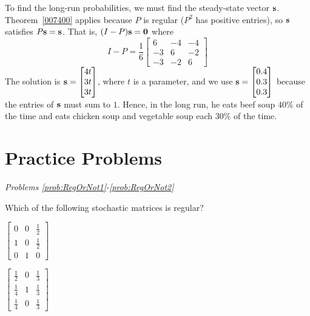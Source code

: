 \documentclass{ximera}
\begin{document}
\begin{example}
\begin{explanation}
To find the long-run probabilities, we must find the steady-state vector ${\bf s}$. Theorem~\ref{007400} applies because $P$ is regular ($P^{2}$ has positive entries), so ${\bf s}$ satisfies $P{\bf s} = {\bf s}$. That is, $(I - P){\bf s} = {\bf 0}$ where
\begin{equation*}
I - P = \frac{1}{6} \begin{bmatrix}
6 & -4 & -4 \\
-3 & 6 & -2 \\
-3 & -2 & 6
\end{bmatrix}
\end{equation*}
The solution is ${\bf s} = \begin{bmatrix}
4t \\
3t \\
3t
\end{bmatrix}$,
 where $t$ is a parameter, and we use ${\bf s} = \begin{bmatrix}
 0.4 \\
 0.3 \\
 0.3
\end{bmatrix}$
 because the entries of ${\bf s}$ must sum to $1$. Hence, in the long run, he eats beef soup $40\%$ of the time and eats chicken soup and vegetable soup each $30\%$ of the time.
\end{explanation}
\end{example}

\section*{Practice Problems}

\emph{Problems \ref{prob:RegOrNot1}-\ref{prob:RegOrNot2}}

Which of the following stochastic matrices is regular?

\begin{problem}\label{prob:RegOrNot1}
$\begin{bmatrix}
0 & 0 & \frac{1}{2} \\
1 & 0 & \frac{1}{2} \\
0 & 1 & 0
\end{bmatrix}$
 \begin{multipleChoice}
 \end{multipleChoice}
\end{problem}

\begin{problem}\label{prob:RegOrNot2}
$\begin{bmatrix}
\frac{1}{2} & 0 & \frac{1}{3} \\
\frac{1}{4} & 1 & \frac{1}{3} \\
\frac{1}{4} & 0 & \frac{1}{3}
\end{bmatrix}$
 \begin{multipleChoice}
 \end{multipleChoice}
\end{problem}
\end{document}
